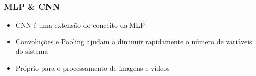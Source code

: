 \documentclass[tikz,10pt]{beamer}
\begin{document}
\begin{frame}
	\frametitle{MLP \& CNN}
	\centering
	\begin{itemize}
		\item CNN é uma extensão do conceito da MLP
		\item Convoluções e Pooling ajudam a diminuir rapidamente o número de variáveis do sistema
		\item Próprio para o processamento de imagens e vídeos		
	\end{itemize}
\end{frame}

\end{document}
